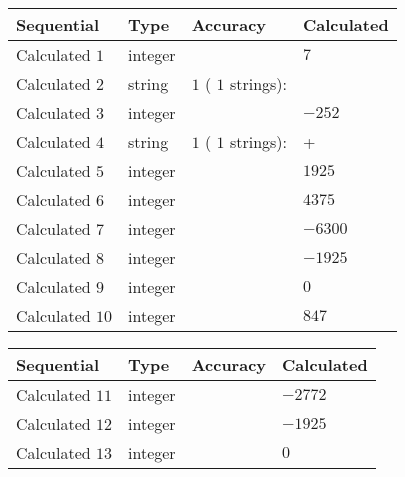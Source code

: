 \documentclass[12pt]{article}
\begin{document}
  
\noindent\begin{tabular}{|l|l|l|l|}
\hline
 Sequential & Type & Accuracy & Calculated \\ 
\hline
 
 
  Calculated $            1 $ & integer &  & 
  $ 7 $ 
 \\  \hline  
 
 
  Calculated $            2 $ & string & $            1  $ ( $           1  $ strings): 
 & 
 \\  \hline  
 
 
  Calculated $            3 $ & integer &  & 
  $ -252 $ 
 \\  \hline  
 
 
  Calculated $            4 $ & string & $            1  $ ( $           1  $ strings): 
 & +
 \\  \hline  
 
 
  Calculated $            5 $ & integer &  & 
  $ 1925 $ 
 \\  \hline  
 
 
  Calculated $            6 $ & integer &  & 
  $ 4375 $ 
 \\  \hline  
 
 
  Calculated $            7 $ & integer &  & 
  $ -6300 $ 
 \\  \hline  
 
 
  Calculated $            8 $ & integer &  & 
  $ -1925 $ 
 \\  \hline  
 
 
  Calculated $            9 $ & integer &  & 
  $ 0 $ 
 \\  \hline  
 
 
  Calculated $           10 $ & integer &  & 
  $ 847 $ 
 \\  \hline  
 \end{tabular}
   
   
  
  
\noindent\begin{tabular}{|l|l|l|l|}
\hline
 Sequential & Type & Accuracy & Calculated \\ 
\hline
 
 
  Calculated $           11 $ & integer &  & 
  $ -2772 $ 
 \\  \hline  
 
 
  Calculated $           12 $ & integer &  & 
  $ -1925 $ 
 \\  \hline  
 
 
  Calculated $           13 $ & integer &  & 
  $ 0 $ 
 \\  \hline  
 \end{tabular}
   
\end{document}
